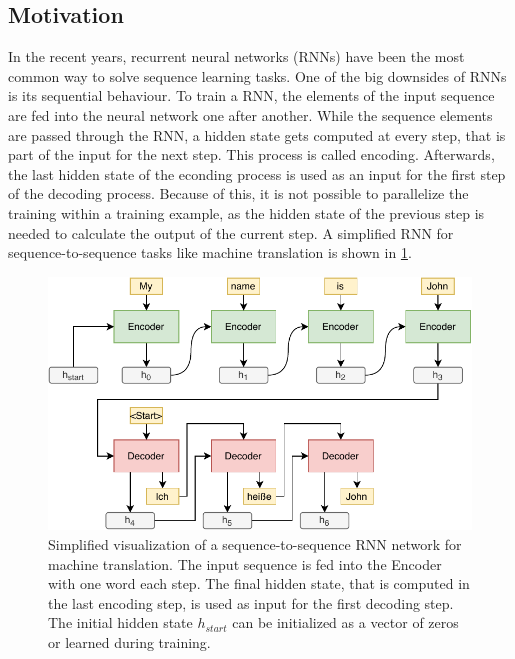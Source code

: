 \subsection{Motivation}\label{ssec:transformer-motivation}

In the recent years, recurrent neural networks (RNNs) have been the most common way to solve sequence learning tasks.
One of the big downsides of RNNs is its sequential behaviour.
To train a RNN, the elements of the input sequence are fed into the neural network one after another.
While the sequence elements are passed through the RNN, a hidden state gets computed at every step, that is part of the input for the next step.
This process is called encoding.
Afterwards, the last hidden state of the econding process is used as an input for the first step of the decoding process.
Because of this, it is not possible to parallelize the training within a training example, as the hidden state of the previous step is needed to calculate the output of the current step. \cite[p.~2]{1706.03762}
A simplified RNN for sequence-to-sequence tasks like machine translation is shown in \cref{fig:rnn-visualization}.

\begin{figure}[h]
\centering
\includegraphics{figures/rnn-visualization}
\caption[Simplified visualization of a sequence-to-sequence RNN network for machine translation]{Simplified visualization of a sequence-to-sequence RNN network for machine translation. The input sequence is fed into the Encoder with one word each step. The final hidden state, that is computed in the last encoding step, is used as input for the first decoding step. The initial hidden state $h_{start}$ can be initialized as a vector of zeros or learned during training.}
\label{fig:rnn-visualization}
\end{figure}

